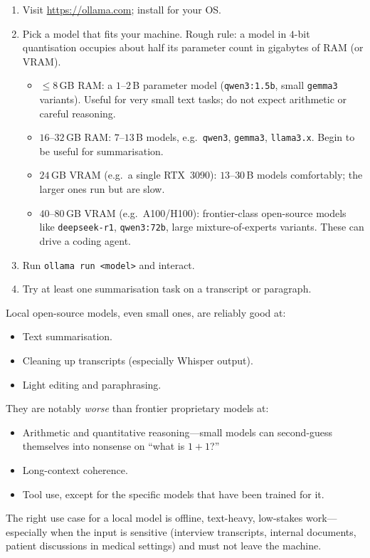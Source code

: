 \begin{algorithmbox}
  \begin{enumerate}[(1)]
    \item Visit \url{https://ollama.com}; install for your OS.
    \item Pick a model that fits your machine.  Rough rule:
      a model in $4$-bit quantisation occupies about half its
      parameter count in gigabytes of RAM (or VRAM).
      \begin{itemize}
        \item $\le 8$\,GB RAM: a $1$--$2$\,B parameter model
          (\texttt{qwen3:1.5b}, small \texttt{gemma3} variants).
          Useful for very small text tasks; do not expect
          arithmetic or careful reasoning.
        \item $16$--$32$\,GB RAM: $7$--$13$\,B models, e.g.\
          \texttt{qwen3}, \texttt{gemma3}, \texttt{llama3.x}.
          Begin to be useful for summarisation.
        \item $24$\,GB VRAM (e.g.\ a single RTX~3090):
          $13$--$30$\,B models comfortably; the larger ones run
          but are slow.
        \item $40$--$80$\,GB VRAM (e.g.\ A100/H100):
          frontier-class open-source models like
          \texttt{deepseek-r1}, \texttt{qwen3:72b}, large
          mixture-of-experts variants.  These can drive a
          coding agent.
      \end{itemize}
    \item Run \texttt{ollama run <model>} and interact.
    \item Try at least one summarisation task on a transcript
      or paragraph.
  \end{enumerate}
\end{algorithmbox}

\begin{remark}
  Local open-source models, even small ones, are reliably
  good at:
  \begin{itemize}
    \item Text summarisation.
    \item Cleaning up transcripts (especially Whisper output).
    \item Light editing and paraphrasing.
  \end{itemize}
  They are notably \emph{worse} than frontier proprietary
  models at:
  \begin{itemize}
    \item Arithmetic and quantitative reasoning---small
      models can second-guess themselves into nonsense on
      ``what is $1 + 1$?''
    \item Long-context coherence.
    \item Tool use, except for the specific models that have
      been trained for it.
  \end{itemize}
  The right use case for a local model is offline,
  text-heavy, low-stakes work---especially when the input is
  sensitive (interview transcripts, internal documents,
  patient discussions in medical settings) and must not
  leave the machine.
\end{remark}

